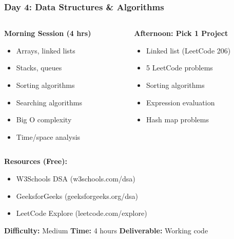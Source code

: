 \begin{frame}[fragile]\frametitle{Day 4: Data Structures \& Algorithms}
\begin{columns}
    \begin{column}[T]{0.5\linewidth}
      \textbf{Morning Session (4 hrs)}
      \begin{itemize}
        \item Arrays, linked lists
        \item Stacks, queues
        \item Sorting algorithms
        \item Searching algorithms
        \item Big O complexity
        \item Time/space analysis
      \end{itemize}
    \end{column}
    \begin{column}[T]{0.5\linewidth}
      \textbf{Afternoon: Pick 1 Project}
      \begin{itemize}
        \item Linked list (LeetCode 206)
        \item 5 LeetCode problems
        \item Sorting algorithms
        \item Expression evaluation
        \item Hash map problems
      \end{itemize}
    \end{column}
  \end{columns}
  
  \vspace{0.3cm}
  \textbf{Resources (Free):}
  \begin{itemize}
    \item W3Schools DSA (w3schools.com/dsa)
    \item GeeksforGeeks (geeksforgeeks.org/dsa)
    \item LeetCode Explore (leetcode.com/explore)
  \end{itemize}

\vspace{0.3cm}    
\textbf{Difficulty:} Medium \textbar \textbf{Time:} 4 hours \textbar \textbf{Deliverable:} Working code  
\end{frame}

